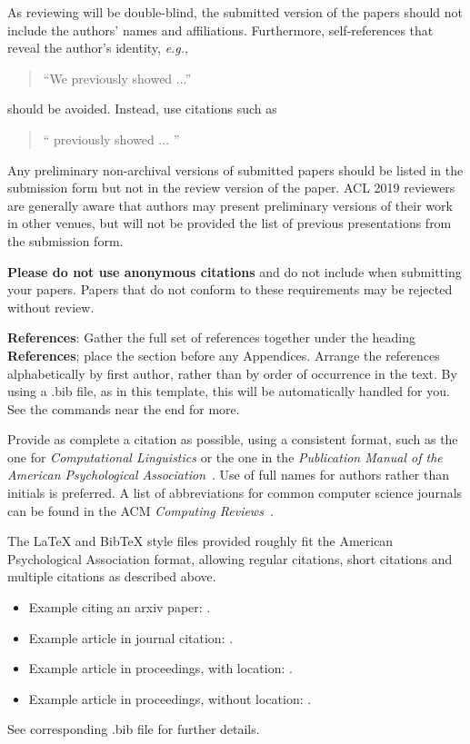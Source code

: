\documentclass[11pt,a4paper]{article}
\begin{document}
As reviewing will be double-blind, the submitted version of the papers
should not include the authors' names and affiliations. Furthermore,
self-references that reveal the author's identity, \emph{e.g.},
\begin{quote}
``We previously showed \cite{Gusfield:97} ...''  
\end{quote}
should be avoided. Instead, use citations such as 
\begin{quote}
``\citeauthor{Gusfield:97} 
previously showed ... ''
\end{quote}

Any preliminary non-archival versions of submitted papers should be listed in the submission form but not in the review version of the paper. ACL 2019 reviewers are generally aware that authors may present preliminary versions of their work in other venues, but will not be provided the list of previous presentations from the submission form. 


\textbf{Please do not use anonymous citations} and do not include
 when submitting your papers. Papers that do not
conform to these requirements may be rejected without review.

\textbf{References}: Gather the full set of references together under
the heading \textbf{References}; place the section before any Appendices. 
Arrange the references alphabetically
by first author, rather than by order of occurrence in the text.
By using a .bib file, as in this template, this will be automatically 
handled for you. See the \verb|| commands near the end for more.

Provide as complete a citation as possible, using a consistent format,
such as the one for \emph{Computational Linguistics\/} or the one in the 
\emph{Publication Manual of the American 
Psychological Association\/}~\cite{APA:83}. Use of full names for
authors rather than initials is preferred. A list of abbreviations
for common computer science journals can be found in the ACM 
\emph{Computing Reviews\/}~\cite{ACM:83}.

The \LaTeX{} and Bib\TeX{} style files provided roughly fit the
American Psychological Association format, allowing regular citations, 
short citations and multiple citations as described above.  

\begin{itemize}
\item Example citing an arxiv paper: \cite{rasooli-tetrault-2015}. 
\item Example article in journal citation: \cite{Ando2005}.
\item Example article in proceedings, with location: \cite{borsch2011}.
\item Example article in proceedings, without location: \cite{andrew2007scalable}.
\end{itemize}
See corresponding .bib file for further details.
\end{document}

